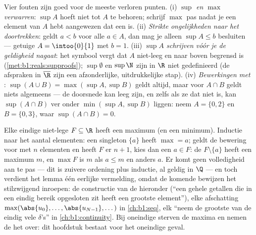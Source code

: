 \begin{remark}
Vier fouten zijn goed voor de meeste verloren punten. (i) \emph{$\sup$ en
$\max$ verwarren}: $\sup A$ hoeft niet tot $A$ te behoren; schrijf $\max$
pas nadat je een element van $A$ hebt aangewezen dat een  is.
(ii) \emph{Strikte ongelijkheden naar het  doortrekken}: geldt $a
< b$ voor alle $a \in A$, dan mag je alleen $\sup A \leq b$ besluiten ---
getuige $A = \intoo{0}{1}$ met $b = 1$. (iii) \emph{$\sup A$ schrijven
vóór je de geldigheid nagaat}: het symbool vergt dat $A$ niet-leeg en
naar boven begrensd is (\cref{met:b1:reals:supproofs}); $\sup \emptyset$
en $\sup \N$ zijn in $\R$ niet gedefinieerd (de afspraken in
$\overline\R$ zijn een afzonderlijke, uitdrukkelijke stap). (iv)
\emph{Bewerkingen met }: $\sup(A \cup B) = \max(\sup A, \sup
B)$ geldt altijd, maar voor $A \cap B$ geldt niets algemeens --- de
doorsnede kan leeg zijn, en zelfs als ze dat niet is, kan $\sup(A \cap
B)$ ver onder $\min(\sup A, \sup B)$ liggen: neem $A = \{0, 2\}$ en $B =
\{0, 3\}$, waar $\sup(A \cap B) = 0$.
\end{remark}

\begin{example}\label{ex:b1:reals:finitemax}
Elke eindige niet-lege $F \subseteq \R$ heeft een maximum (en een
minimum). Inductie naar het aantal elementen: een singleton $\{a\}$ heeft
$\max = a$; geldt de bewering voor  met $n$ elementen en
heeft $F$ er $n + 1$, kies dan een $a \in F$: de  $F \setminus
\{a\}$ heeft een maximum $m$, en $\max F$ is $m$ als $a \leq m$ en anders
$a$. Er komt geen volledigheid aan te pas --- dit is zuivere ordening
plus inductie, al geldig in $\Q$ --- en toch verdient het lemma één
eerlijke vermelding, omdat de komende bewijzen het stilzwijgend
inroepen: de constructie van de  hieronder (``een  gehele
getallen die in een eindig bereik opgesloten zit heeft een grootste
element''), elke afschatting $\max(\abs{u_0}, \dots, \abs{u_{N-1}},
\dots)$ in \cref{ch:b1:seq}, elk ``neem de grootste van de eindig vele
$\delta$'s'' in \cref{ch:b1:continuity}. Bij oneindige 
sterven de maxima en nemen de  het over: dit hoofdstuk bestaat
voor het oneindige geval.
\end{example}


